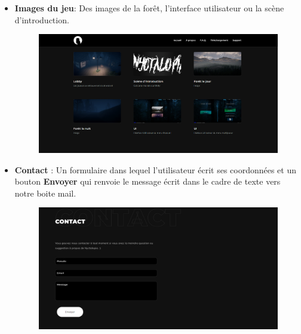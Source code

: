 \begin{itemize}
    \item \textbf{Images du jeu}: Des images de la forêt, l'interface utilisateur ou la scène d'introduction.
    \newline
    
\begin{figure}[H]
\centering
\begin{minipage}{.5\textwidth}
  \centering
  \centerline{\includegraphics[width=1\linewidth]{img/1.PNG}}
  \label{fig:imggame}
\end{minipage}%
\end{figure}

    \item \textbf{Contact} : Un formulaire dans lequel l'utilisateur écrit ses coordonnées et un bouton \textbf{Envoyer} qui renvoie le message écrit dans le cadre de texte vers notre boite mail.
    \newline
    
\begin{figure}[H]
\centering
\begin{minipage}{.5\textwidth}
  \centering
  \centerline{\includegraphics[width=1\linewidth]{img/Contact.png}}
  \label{fig:contact}
\end{minipage}%
\end{figure}



\end{itemize}

